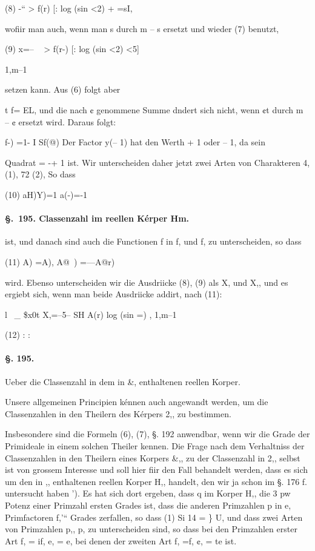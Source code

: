 \documentclass[12pt,a4paper]{article}
\theoremstyle{plain}
\theoremstyle{definition}
\begin{document}
(8) -`` > f(r) [: log (sin <2) + =sI,

wofiir man auch, wenn man s durch m -- s ersetzt und wieder (7) benutzt,

(9) x=-- ~ > f(r-) [: log (sin <2) <5]

1,m--1

setzen kann. Aus (6) folgt aber

t f= EL, und die nach ¢ genommene Summe dndert sich nicht, wenn ¢t durch m -- ¢ ersetzt wird. Daraus folgt:

f-) =1- I Sf(@) Der Factor y(-- 1) hat den Werth + 1 oder -- 1, da sein

Quadrat = -+ 1 ist. Wir unterscheiden daher jetzt zwei Arten von Charakteren 4, (1), 72 (2), So dass

(10) aH)Y)=1 a(-)=-1

\paragraph{\S.~195. Classenzahl im reellen Kérper Hm.}


ist, und danach sind auch die Functionen f in f, und f, zu unterscheiden, so dass

(11) A) =A), A@~) =---A@r)

wird. Ebenso unterscheiden wir die Ausdriicke (8), (9) als X, und X,, und es ergiebt sich, wenn man beide Ausdriicke addirt, nach (11):

l~ \_ \$x0t X,=--5-- SH A(r) log (sin =) , 1,m--1

(12) : :

\paragraph{§. 195.}

Ueber die Classenzahl in dem in \&, enthaltenen reellen Korper.

Unsere allgemeinen Principien kénnen auch angewandt werden, um die Classenzahlen in den Theilern des Kérpers 2,, zu bestimmen.

Insbesondere sind die Formeln (6), (7), §. 192 anwendbar, wenn wir die Grade der Primideale in einem solchen Theiler kennen. Die Frage nach dem Verhaltniss der Classenzahlen in den Theilern eines Korpers \&,, zu der Classenzahl in 2,, selbst ist von grossem Interesse und soll hier fiir den Fall behandelt werden, dass es sich um den in ,, enthaltenen reellen Korper H,, handelt, den wir ja schon im §. 176 f. untersucht haben '). Es hat sich dort ergeben, dass q im Korper H,, die 3 pw Potenz einer Primzahl ersten Grades ist, dass die anderen Primzahlen p in e, Primfactoren f,'`` Grades zerfallen, so dass (1) Si 14 = \} U, und dass zwei Arten von Primzahlen p,, p, zu unterscheiden sind, so dass bei den Primzahlen erster Art f, = if, e, = e, bei denen der zweiten Art f, =f, ¢, = te ist.
\end{document}
